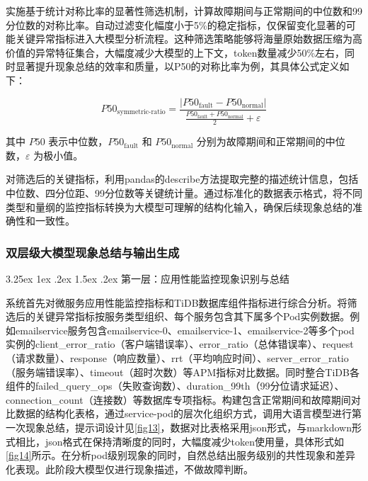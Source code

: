 \documentclass[11pt]{article}
\makeatletter
\renewcommand{\paragraph}{%
    \@startsection{paragraph}{4}{\z@}%
    {3.25ex \@plus1ex \@minus.2ex}%
    {1.5ex \@plus.2ex}%
    {\normalfont\normalsize\bfseries}%
}
\makeatother
\begin{document}
实施基于统计对称比率的显著性筛选机制，计算故障期间与正常期间的中位数和99分位数的对称比率。自动过滤变化幅度小于5\%的稳定指标，仅保留变化显著的可能关键异常指标进入大模型分析流程。这种筛选策略能够将海量原始数据压缩为高价值的异常特征集合，大幅度减少大模型的上下文，token数量减少50\%左右，同时显著提升现象总结的效率和质量，以P50的对称比率为例，其具体公式定义如下：

\begin{equation}
P50_{\mathrm{symmetric\text{-}ratio}} = \frac{ \left| P50_{\mathrm{fault}} - P50_{\mathrm{normal}} \right| }{ \frac{ P50_{\mathrm{fault}} + P50_{\mathrm{normal}} }{2} + \varepsilon }
\end{equation}

其中 $P50$ 表示中位数，$P50_{\mathrm{fault}}$ 和 $P50_{\mathrm{normal}}$ 分别为故障期间和正常期间的中位数，$\varepsilon$ 为极小值。

对筛选后的关键指标，利用pandas的describe方法提取完整的描述统计信息，包括中位数、四分位距、99分位数等关键统计量。通过标准化的数据表示格式，将不同类型和量纲的监控指标转换为大模型可理解的结构化输入，确保后续现象总结的准确性和一致性。

\subsubsection{双层级大模型现象总结与输出生成}

\paragraph{第一层：应用性能监控现象识别与总结}

系统首先对微服务应用性能监控指标和TiDB数据库组件指标进行综合分析。将筛选后的关键异常指标按服务类型组织、每个服务包含其下属多个Pod实例数据。例如emailservice服务包含emailservice-0、emailservice-1、emailservice-2等多个pod实例的client\_error\_ratio（客户端错误率）、error\_ratio（总体错误率）、request（请求数量）、response（响应数量）、rrt（平均响应时间）、server\_error\_ratio（服务端错误率）、timeout（超时次数）等APM指标对比数据。同时整合TiDB各组件的failed\_query\_ops（失败查询数）、duration\_99th（99分位请求延迟）、connection\_count（连接数）等数据库专项指标。构建包含正常期间和故障期间对比数据的结构化表格，通过service-pod的层次化组织方式，调用大语言模型进行第一次现象总结，提示词设计见\ref{fig13}，数据对比表格采用json形式，与markdown形式相比，json格式在保持清晰度的同时，大幅度减少token使用量，具体形式如\ref{fig14}所示。在分析pod级别现象的同时，自然总结出服务级别的共性现象和差异化表现。此阶段大模型仅进行现象描述，不做故障判断。
\end{document}
